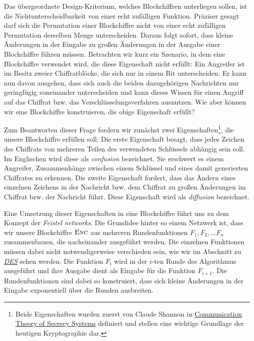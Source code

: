 Das übergeordnete Design-Kriterium, welches Blockchiffren unterliegen sollen, ist die Nichtunterscheidbarkeit von einer echt zufälligen Funktion. Präziser gesagt darf sich die Permutation einer Blockchiffre nicht von einer echt zufälligen Permutation derselben Menge unterscheiden. Daraus folgt sofort, dass kleine Änderungen in der Eingabe zu großen Änderungen in der Ausgabe einer Blockchiffre führen müssen. Betrachten wir kurz ein Szenario, in dem eine Blockchiffre verwendet wird, die diese Eigenschaft nicht erfüllt: Ein Angreifer ist im Besitz zweier Chiffratblöcke, die sich nur in einem Bit unterscheiden. Er kann nun davon ausgehen, dass sich auch die beiden dazugehörigen Nachrichten nur geringfügig voneinander unterscheiden und kann dieses Wissen für einen Angriff auf das Chiffrat bzw. das Verschlüsselungsverfahren ausnutzen. Wie aber können wir eine Blockchiffre konstruieren, die obige Eigenschaft erfüllt?

Zum Beantworten dieser Frage fordern wir zunächst zwei Eigenschaften\footnote{Beide Eigenschaften wurden zuerst von Claude Shannon in \href{http://netlab.cs.ucla.edu/wiki/files/shannon1949.pdf}{Communication Theory of Secrecy Systems} definiert und stellen eine wichtige Grundlage der heutigen Kryptographie dar.}, die unsere Blockchiffre erfüllen soll:
Die erste Eigenschaft besagt, dass jedes Zeichen des Chiffrats von mehreren Teilen des verwendeten Schlüssels abhängig sein soll. Im Englischen wird diese als \textit{confusion} bezeichnet. Sie erschwert es einem Angreifer, Zusammenhänge zwischen einem Schlüssel und eines damit generierten Chiffrates zu erkennen.
Die zweite Eigenschaft fordert, dass das Ändern eines einzelnen Zeichens in der Nachricht bzw. dem Chiffrat zu großen Änderungen im Chiffrat bzw. der Nachricht führt. Diese Eigenschaft wird als \textit{diffusion} bezeichnet.


Eine Umsetzung dieser Eigenschaften in eine Blockchiffre führt uns zu dem Konzept der \textit{Feistel networks}.
Die Grundidee hinter so einem Netzwerk ist, dass wir unsere Blockchiffre \(\textsc{Enc}\) aus mehreren Rundenfunktionen \(F_1, F_2,...F_n\) zusammenbauen, die nacheinander ausgeführt werden. Die einzelnen Funktionen müssen dabei nicht notwendigerweise verschieden sein, wie wir im Abschnitt zu \hyperref[sssec:des]{\textit{DES}} sehen werden. Die Funktion \(F_i\) wird in der $i$-ten Runde des Algorithmus ausgeführt und ihre Ausgabe dient als Eingabe für die Funktion \(F_{i+1}\). Die Rundenfunktionen sind dabei so konstruiert, dass sich kleine Änderungen in der Eingabe exponentiell über die Runden ausbreiten.

